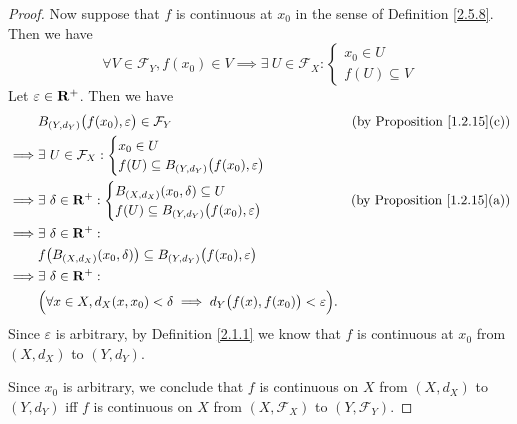 \begin{proof}
    Now suppose that \(f\) is continuous at \(x_0\) in the sense of Definition \ref{2.5.8}.
    Then we have
    \[
        \forall V \in \mathcal{F}_Y, f(x_0) \in V \implies \exists\ U \in \mathcal{F}_X : \begin{cases}
            x_0 \in U \\
            f(U) \subseteq V
        \end{cases}
    \]
    Let \(\varepsilon \in \mathbf{R}^+\).
    Then we have
    \begin{align*}
                 & B_{(Y, d_Y)}\big(f(x_0), \varepsilon\big) \in \mathcal{F}_Y                                       & \text{(by Proposition \ref{1.2.15}(c))} \\
        \implies & \exists\ U \in \mathcal{F}_X : \begin{cases}
                                                      x_0 \in U \\
                                                      f(U) \subseteq B_{(Y, d_Y)}\big(f(x_0), \varepsilon\big)
                                                  \end{cases}                                                      \\
        \implies & \exists\ \delta \in \mathbf{R}^+ : \begin{cases}
                                                  B_{(X, d_X)}(x_0, \delta) \subseteq U \\
                                                  f(U) \subseteq B_{(Y, d_Y)}\big(f(x_0), \varepsilon\big)
                                              \end{cases}                                          & \text{(by Proposition \ref{1.2.15}(a))}                   \\
        \implies & \exists\ \delta \in \mathbf{R}^+ :                                                                                                                  \\
                 & f\big(B_{(X, d_X)}(x_0, \delta)\big) \subseteq B_{(Y, d_Y)}\big(f(x_0), \varepsilon\big)                                                    \\
        \implies & \exists\ \delta \in \mathbf{R}^+ :                                                                                                                  \\
                 & \Big(\forall x \in X, d_X(x, x_0) < \delta \implies d_Y\big(f(x), f(x_0)\big) < \varepsilon\Big).
    \end{align*}
    Since \(\varepsilon\) is arbitrary, by Definition \ref{2.1.1} we know that \(f\) is continuous at \(x_0\) from \((X, d_X)\) to \((Y, d_Y)\).

    Since \(x_0\) is arbitrary, we conclude that \(f\) is continuous on \(X\) from \((X, d_X)\) to \((Y, d_Y)\) iff \(f\) is continuous on \(X\) from \((X, \mathcal{F}_X)\) to \((Y, \mathcal{F}_Y)\).
\end{proof}

